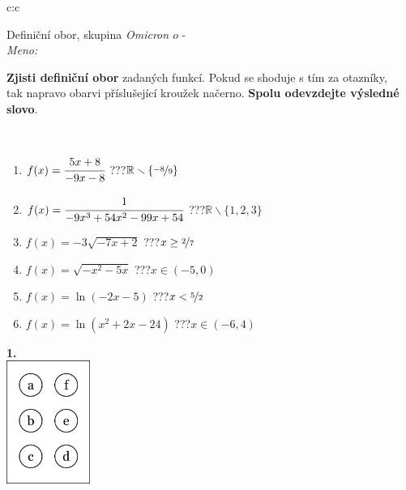 \documentclass[10pt]{report}
\newcommand\omicron{o}
\begin{document}
\begin{tabular}{c:c}
\begin{minipage}[c][104.5mm][t]{0.5\linewidth}
\begin{center}
\vspace{7mm}
{\huge Definiční obor, skupina \textit{Omicron $\omicron$} -}\\[5mm]
\textit{Meno:}\phantom{xxxxxxxxxxxxxxxxxxxxxxxxxxxxxxxxxxxxxxxxxxxxxxxxxxxxxxxxxxxxxxxxx}\\[5mm]
\begin{minipage}{0.95\linewidth}
\textbf{Zjisti definiční obor} zadaných funkcí. Pokud se shoduje s tím za otazníky,\\tak napravo obarvi příslušející kroužek načerno. \textbf{Spolu odevzdejte výsledné slovo}.
\end{minipage}
\\[1mm]
\begin{minipage}{0.79\linewidth}
\begin{center}
\begin{varwidth}{\linewidth}
\begin{enumerate}
\normalsizerrr
\item $f(x)=\cfrac{5x+8}{-9x-8}$\quad \dotfill\; ???\;\dotfill \quad $\mathbb{R}\smallsetminus\{\nicefrac{-8}{9}\}$
\item $f(x)=\cfrac{1}{-9x^3+54x^2-99x+54}$\quad \dotfill\; ???\;\dotfill \quad $\mathbb{R}\smallsetminus\{1,2,3\}$
\item $f(x)=-3\sqrt{-7x+2}$\quad \dotfill\; ???\;\dotfill \quad $x\geq\nicefrac{2}{7}$
\item $f(x)=\sqrt{-x^2-5x}$\quad \dotfill\; ???\;\dotfill \quad $x\in(-5 , 0)$
\item $f(x)=\ln{(-2x-5)}$\quad \dotfill\; ???\;\dotfill \quad $x<\nicefrac{5}{2}$
\item $f(x)=\ln{(x^2+2x-24)}$\quad \dotfill\; ???\;\dotfill \quad $x\in(-6 , 4)$
\end{enumerate}
\end{varwidth}
\end{center}
\end{minipage}
\begin{minipage}{0.20\linewidth}
\begin{center}
{\Huge\bfseries 1.} \\[2mm]
\includegraphics[height=40mm]{../images/braille.png}

\end{center}
\end{minipage}
\end{center}
\end{minipage}
\end{tabular}
\end{document}
